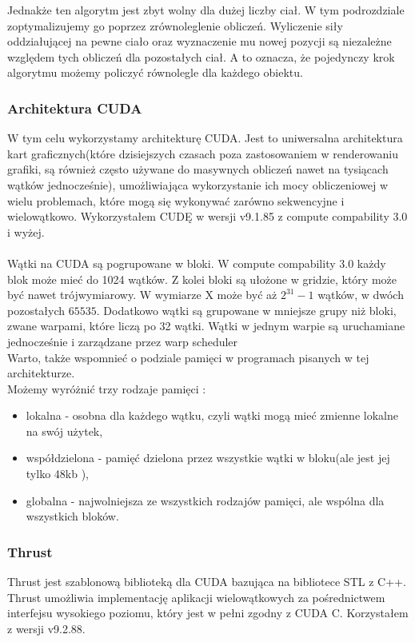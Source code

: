 \documentclass[14pt,twoside,a4paper]{article}
\theoremstyle{definition}
\begin{document}
Jednakże ten algorytm jest zbyt wolny dla dużej liczby ciał. W tym podrozdziale zoptymalizujemy go poprzez zrównoleglenie obliczeń. Wyliczenie siły oddziałującej na pewne ciało oraz wyznaczenie mu nowej pozycji są niezależne względem tych obliczeń dla pozostałych ciał. A to oznacza, że pojedynczy krok algorytmu możemy policzyć równolegle dla każdego obiektu.

\subsubsection{\large Architektura CUDA}
W tym celu wykorzystamy architekturę CUDA. 
Jest to uniwersalna architektura kart graficznych(które dzisiejszych czasach poza zastosowaniem w renderowaniu grafiki, są również często używane do masywnych obliczeń nawet na tysiącach wątków jednocześnie), umożliwiająca wykorzystanie ich mocy obliczeniowej w wielu problemach, które mogą się wykonywać zarówno sekwencyjne i wielowątkowo. Wykorzystałem CUDĘ w wersji v9.1.85 z compute compability 3.0 i wyżej. \\~\\
Wątki na CUDA są pogrupowane w bloki. W compute compability 3.0 każdy blok może mieć do 1024 wątków. Z kolei bloki są ułożone w gridzie, który może być nawet trójwymiarowy. W wymiarze X może być aż $2^{31}-1$ wątków, w dwóch pozostałych $65535$. \cite[str.~238-242]{Cuda} Dodatkowo wątki są grupowane w mniejsze grupy niż bloki, zwane warpami, które liczą po 32 wątki. Wątki w jednym warpie są uruchamiane jednocześnie i zarządzane przez warp scheduler \cite[str.~70]{Cuda} \\
\bigskip
Warto, także wspomnieć o podziale pamięci w programach pisanych w tej architekturze. \\Możemy wyróżnić trzy rodzaje pamięci :
\begin{itemize}
  \item lokalna - osobna dla każdego wątku, czyli wątki mogą mieć zmienne lokalne na swój użytek,
  \item współdzielona - pamięć dzielona przez wszystkie wątki w bloku(ale jest jej tylko 48kb \cite[str.~238-242]{Cuda}),
  \item globalna - najwolniejsza ze wszystkich rodzajów pamięci, ale wspólna dla wszystkich bloków.
\end{itemize}

\subsubsection{\large Thrust}
Thrust jest szablonową biblioteką dla CUDA bazująca na bibliotece STL z C++. Thrust umożliwia implementację aplikacji wielowątkowych za pośrednictwem interfejsu wysokiego poziomu, który jest w pełni zgodny z CUDA C. Korzystałem z wersji v9.2.88. \cite{thrust}
\end{document}
